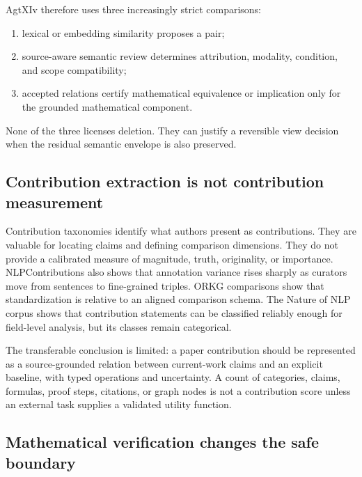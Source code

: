 AgtXIv therefore uses three increasingly strict comparisons:
\begin{enumerate}
  \item lexical or embedding similarity proposes a pair;
  \item source-aware semantic review determines attribution, modality, condition, and scope compatibility;
  \item accepted \MathClaim{} relations certify mathematical equivalence or implication only for the grounded mathematical component.
\end{enumerate}
None of the three licenses deletion. They can justify a reversible view decision when the residual semantic envelope is also preserved.

\subsection{Contribution extraction is not contribution measurement}

Contribution taxonomies identify what authors present as contributions. They are valuable for locating claims and defining comparison dimensions. They do not provide a calibrated measure of magnitude, truth, originality, or importance. NLPContributions also shows that annotation variance rises sharply as curators move from sentences to fine-grained triples. ORKG comparisons show that standardization is relative to an aligned comparison schema. The Nature of NLP corpus shows that contribution statements can be classified reliably enough for field-level analysis, but its classes remain categorical.

The transferable conclusion is limited: a paper contribution should be represented as a source-grounded relation between current-work claims and an explicit baseline, with typed operations and uncertainty. A count of categories, claims, formulas, proof steps, citations, or graph nodes is not a contribution score unless an external task supplies a validated utility function.

\subsection{Mathematical verification changes the safe boundary}

